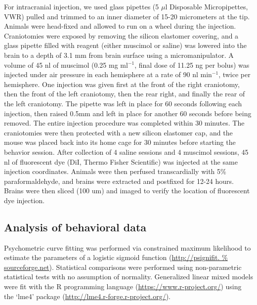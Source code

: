 For intracranial injection, we used glass pipettes (5 $\mu$l Disposable Micropipettes, VWR) pulled and trimmed to an inner diameter of 15-20 micrometers at the tip.
%
Animals were head-fixed and allowed to run on a wheel during the injection.
%
Craniotomies were exposed by removing the silicon elastomer covering, and a glass pipette filled with reagent (either muscimol or saline) was lowered into the brain to a depth of 3.1 mm from brain surface using a micromanipulator.
%
A volume of 45 nl of muscimol (0.25 mg ml$^{-1}$, final dose of 11.25 ng per bolus) was injected under air pressure in each hemisphere at a rate of 90 nl min$^{-1}$, twice per hemisphere.  %
%
One injection was given first at the front of the right craniotomy, then the front of the left craniotomy, then the rear right, and finally the rear of the left craniotomy. 
%
%
The pipette was left in place for 60 seconds following each injection, then raised 0.5mm and left in place for another 60 seconds before being removed.
%
The entire injection procedure was completed within 30 minutes.
%
The craniotomies were then protected with a new silicon elastomer cap, and the mouse was placed back into its home cage for 30 minutes before starting the behavior session.
%
After collection of 4 saline sessions and 4 muscimol sessions, 45 nl of fluorescent dye (DiI, Thermo Fisher Scientific) was injected at the same injection coordinates.
%
Animals were then perfused transcardially with 5\% paraformaldehyde, and brains were extracted and postfixed for 12-24 hours.
%
Brains were then sliced (100 um) and imaged to verify the location of fluorescent dye injection.  

\subsection{Analysis of behavioral data}

Psychometric curve fitting was performed via constrained maximum likelihood to estimate the parameters of a logistic sigmoid function (\url{http://psignifit.
%
sourceforge.net}). Statistical comparisons were performed using non-parametric statistical tests with no assumption of normality. 
%
Generalized linear mixed models were fit with the R programming language (\url{https://www.r-project.org/}) using the `lme4' package (\url{http://lme4.r-forge.r-project.org/}).


